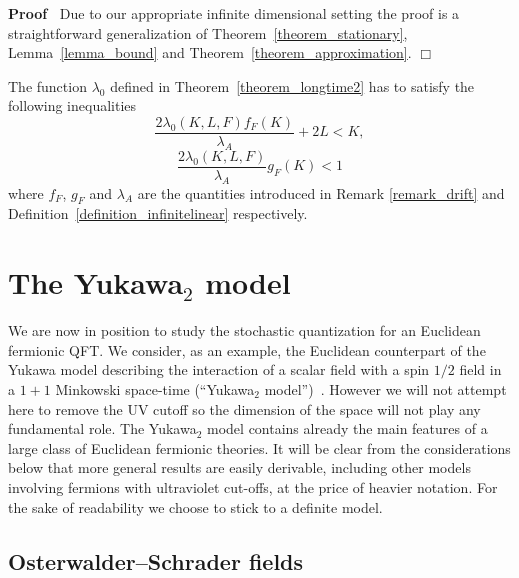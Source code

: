 \documentclass[11pt]{article}
\newenvironment{proof}{\noindent\textbf{Proof\ }}{\hspace*{\fill}$\Box$\medskip}
\begin{document}
\begin{proof}
  Due to our appropriate infinite dimensional setting the proof is a
  straightforward generalization of Theorem~\ref{theorem_stationary},
  Lemma~\ref{lemma_bound} and Theorem~\ref{theorem_approximation}.
\end{proof}

\begin{remark}
  The function $\lambda_0$ defined in Theorem~\ref{theorem_longtime2} has to
  satisfy the following inequalities
  \begin{equation}
    \frac{2 \lambda_0 (K, L, F) f_F (K)}{\lambda_A} + 2 L < K
    \label{eq:contraction3},
  \end{equation}
  \begin{equation}
    \frac{2 \lambda_0 (K, L, F)}{\lambda_A} g_F (K) < 1
    \label{eq:contraction4}
  \end{equation}
  where $f_F$, $g_F$ and $\lambda_A$ are the quantities introduced in Remark
  \ref{remark_drift} and Definition~\ref{definition_infinitelinear}
  respectively.
\end{remark}

\section{The Yukawa$_2$ model}\label{sec:yukawa}

We are now in position to study the stochastic quantization for an Euclidean
fermionic QFT. We consider, as an example, the Euclidean counterpart of the
Yukawa model describing the interaction of a scalar field with a spin $1 / 2$
field in a $1 + 1$ Minkowski space-time (``Yukawa$_2$
model'')~{\cite{osterwalder_euclidean_1973,cooper_weakly_1977,battle_infinite_1981,lesniewski_effective_1987,summers2012perspective}}.
However we will not attempt here to remove the UV cutoff so the dimension of
the space will not play any fundamental role. The Yukawa$_2$ model contains
already the main features of a large class of Euclidean fermionic theories. It
will be clear from the considerations below that more general results are
easily derivable, including other models involving fermions with ultraviolet
cut-offs, at the price of heavier notation. For the sake of readability we
choose to stick to a definite model.

\subsection{Osterwalder--Schrader fields}\label{sec:os-fields}
\end{document}
